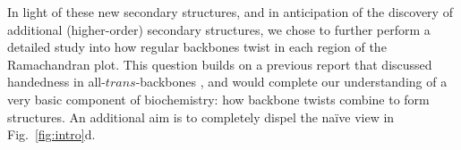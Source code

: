 \documentclass[fleqn,10pt]{wlpeerj} %
\newcommand{\Fig}[1]{Fig.~\ref{#1}}
\begin{document}
In light of these new secondary structures, and in anticipation of the discovery of additional (higher-order) secondary structures, we chose to further perform a detailed study into how regular backbones twist in each region of the Ramachandran plot. This question builds on a previous report that discussed handedness in all-$trans$-backbones \citep{Zacharias2013}, and would complete our understanding of a very basic component of biochemistry: how backbone twists combine to form structures. An additional aim is to completely dispel the na{\"i}ve view in \Fig{fig:intro}d.


\end{document}
